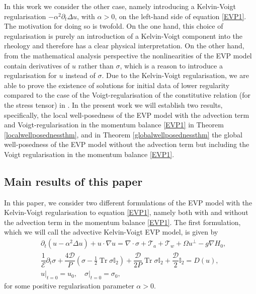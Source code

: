 \documentclass[12pt,a4paper]{article}
\theoremstyle{definition}
\theoremstyle{remark}
\numberwithin{equation}{section}
\DeclareMathOperator{\Tr}{Tr}
\begin{document}
In this work we consider the other case, namely introducing a Kelvin-Voigt regularisation $-\alpha^2 \partial_t \Delta u$, with $\alpha > 0$, on the left-hand side of equation \eqref{EVP1}. The motivation for doing so is twofold. On the one hand, this choice of regularisation is purely an introduction of a Kelvin-Voigt component into the rheology and therefore has a clear physical interpretation. On the other hand, from the mathematical analysis perspective the nonlinearities of the EVP model contain derivatives of $u$ rather than $\sigma$, which is a reason to introduce a regularisation for $u$ instead of $\sigma$. Due to the Kelvin-Voigt regularisation, we are able to prove the existence of solutions for initial data of lower regularity compared to the case of the Voigt-regularisation of the constitutive relation (for the stress tensor) in \cite{boutros2025}. In the present work we will establish two results, specifically, the local well-posedness of the EVP model with the advection term and Voigt-regularisation in the momentum balance \eqref{EVP1} in Theorem \ref{localwellposednessthm}, and in Theorem \ref{globalwellposednessthm} the global well-posedness of the EVP model without the advection term but including the Voigt regularisation in the momentum balance \eqref{EVP1}.
\subsection{Main results of this paper}
In this paper, we consider two different formulations of the EVP model with the Kelvin-Voigt regularisation to equation \eqref{EVP1}, namely both with and without the advection term in the momentum balance \eqref{EVP1}. The first formulation, which we will call the advective Kelvin-Voigt EVP model, is given by
\begin{subequations} \label{advectionsystem}
\begin{align}
	&\partial_t (u - \alpha^2 \Delta u) + u \cdot \nabla u  = \nabla \cdot \sigma + \mathcal{T}_a + \mathcal{T}_w + \Omega u^\perp - g \nabla H_0, \label{advection1} \\
	&\dfrac{1}{\mathcal E} \partial_t \sigma + \dfrac{4 \mathcal{D}}{P} (\sigma - \frac{1}{2} \Tr \sigma \mathbb I_2) + \dfrac{\mathcal{D}}{2P} \Tr \sigma \mathbb I_2 + \dfrac{\mathcal{D}}{2} \mathbb I_2  = D(u), \label{advection2}
	\\
	&u \lvert_{t = 0} = u_0, \quad \sigma \lvert_{t = 0} = \sigma_0, \label{advection3}
\end{align}
\end{subequations}
for some positive regularisation parameter $\alpha > 0$.
\end{document}
